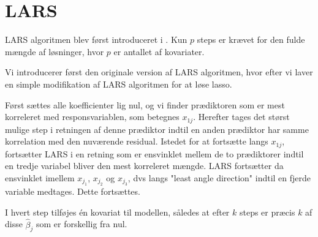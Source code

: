 \section{LARS}
LARS algoritmen blev først introduceret i \citep{efron}. 
Kun \(p\) steps er krævet for den fulde mængde af løsninger, hvor \(p\) er antallet af kovariater.
 
Vi introducerer først den originale version af LARS algoritmen, hvor efter vi laver en simple modifikation af LARS algoritmen for at løse lasso. 

Først sættes alle koefficienter lig nul, og vi finder prædiktoren som er mest korreleret med responsvariablen, som betegnes \(x_{1j}\).
Herefter tages det størst mulige step i retningen af denne prædiktor indtil en anden prædiktor har samme korrelation med den nuværende residual.
Istedet for at fortsætte langs \(x_{1j}\), fortsætter LARS i en retning som er ensvinklet mellem de to prædiktorer indtil en tredje variabel bliver den mest korreleret mængde.
LARS fortsætter da ensvinklet imellem \(x_{j_1}\), \(x_{j_2}\) og \(x_{j_3}\), dvs langs "least angle direction" indtil en fjerde variable medtages.
Dette fortsættes.

I hvert step tilføjes én kovariat til modellen, således at efter \(k\) steps er præcis \(k\) af disse \(\hat{\beta}_j\) som er forskellig fra nul.



%
%

